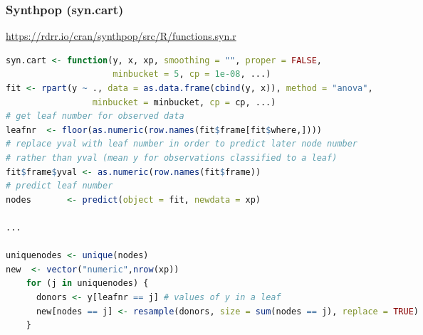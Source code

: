\documentclass[t,8pt,utfx8]{beamer}
\begin{document}
\begin{spacing}{1.25}


\begin{frame}[fragile]
    \frametitle{Synthpop (syn.cart)}
    \url{https://rdrr.io/cran/synthpop/src/R/functions.syn.r}
    \begin{lstlisting}[language=R]
syn.cart <- function(y, x, xp, smoothing = "", proper = FALSE, 
                     minbucket = 5, cp = 1e-08, ...)
fit <- rpart(y ~ ., data = as.data.frame(cbind(y, x)), method = "anova",
                 minbucket = minbucket, cp = cp, ...)
# get leaf number for observed data
leafnr  <- floor(as.numeric(row.names(fit$frame[fit$where,])))
# replace yval with leaf number in order to predict later node number 
# rather than yval (mean y for observations classified to a leaf) 
fit$frame$yval <- as.numeric(row.names(fit$frame))
# predict leaf number
nodes       <- predict(object = fit, newdata = xp)

...

uniquenodes <- unique(nodes)
new  <- vector("numeric",nrow(xp))
    for (j in uniquenodes) {
      donors <- y[leafnr == j] # values of y in a leaf
      new[nodes == j] <- resample(donors, size = sum(nodes == j), replace = TRUE)
    }


\end{lstlisting}
\end{frame}
\end{spacing}
\end{document}
